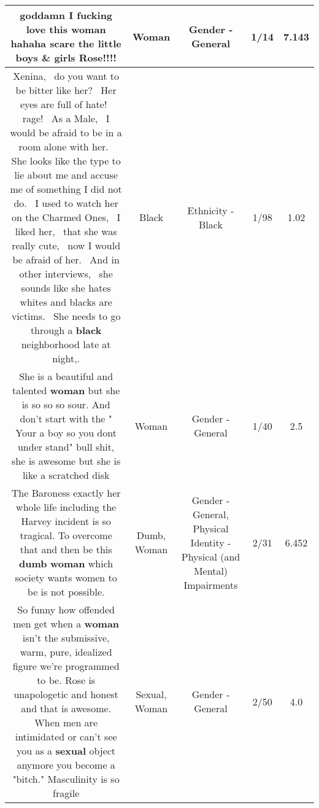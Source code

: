 \documentclass[11pt]{article}
\newlength\mylength
\begin{document}
\begin{center}
\begin{longtable}{|C{.65\mylength}|C{.30\mylength}|C{.12\mylength}|C{.12\mylength}|C{.12\mylength}|}
  \small goddamn I fucking love this \textbf{woman} hahaha scare the little boys \& girls Rose!!!!\normalsize   & Woman & Gender - General & 1/14 & 7.143 \\  \hline
  \small Xenina,  do you want to be bitter like her?  Her eyes are full of hate!  rage!  As a Male,  I would be afraid to be in a room alone with her.  She looks like the type to lie about me and accuse me of something I did not do.  I used to watch her on the Charmed Ones,  I liked her,  that she was really cute,  now I would be afraid of her.  And in other interviews,  she sounds like she hates whites and blacks are victims.  She needs to go through a \textbf{black} neighborhood late at night,.\normalsize   & Black & Ethnicity - Black & 1/98 & 1.02 \\  \hline
  \small She is a beautiful and talented \textbf{woman} but she is so so so sour. And don't start with the " Your  a boy so you dont under stand" bull shit, she is awesome but she is like a scratched disk\normalsize   & Woman & Gender - General & 1/40 & 2.5 \\  \hline
  \small The Baroness exactly her whole life including the Harvey incident is so tragical. To overcome that and then be this \textbf{dumb} \textbf{woman} which society wants women to be is not possible.\normalsize   & Dumb, Woman & Gender - General, Physical Identity - Physical (and Mental) Impairments & 2/31 & 6.452 \\  \hline
  \small So funny how offended men get when a \textbf{woman} isn't the submissive, warm, pure, idealized figure we're programmed to be. Rose is unapologetic and honest and that is awesome. When men are intimidated or can't see you as a \textbf{sexual} object anymore you become a "bitch." Masculinity is so fragile\normalsize   & Sexual, Woman & Gender - General & 2/50 & 4.0 \\  \hline

\end{longtable}
\end{center}
\end{document}

